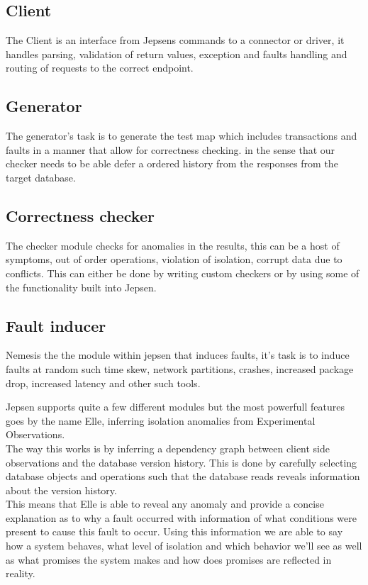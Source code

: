 \documentclass[a4paper,10pt,titlepage]{report}
\begin{document}
    \subsection{Client}
    The Client is an interface from Jepsens commands to a connector or driver, it handles parsing, validation of return values, exception and faults handling and routing of requests to the correct endpoint.
    
    \subsection{Generator}
    The generator's task is to generate the test map which includes transactions and faults in a manner that allow for correctness checking. in the sense that our checker needs to be able defer a ordered history from the responses from the target database.
    
    \subsection{Correctness checker}
    The checker module checks for anomalies in the results, this can be a host of symptoms, out of order operations, violation of isolation, corrupt data due to conflicts. This can either be done by writing custom checkers or by using some of the functionality built into Jepsen.
    
    \subsection{Fault inducer}
    Nemesis the the module within jepsen that induces faults, it's task is to induce faults at random such time skew, network partitions, crashes, increased package drop, increased latency and other such tools.
    
    
    

    Jepsen supports quite a few different modules but the most powerfull features goes by the name Elle, inferring isolation anomalies from Experimental Observations. \\
    \vspace{5mm}
    The way this works is by inferring a dependency graph between client side observations and the database version history. This is done by carefully selecting database objects and operations such that the database reads reveals information about the version history.\\
    \vspace{5mm}
    This means that Elle is able to reveal any anomaly and provide a concise explanation as to why a fault occurred with information of what conditions were present to cause this fault to occur. Using this information we are able to say how a system behaves, what level of isolation and which behavior we'll see as well as what promises the system makes and how does promises are reflected in reality.\\
    \vspace{5mm}
\end{document}
